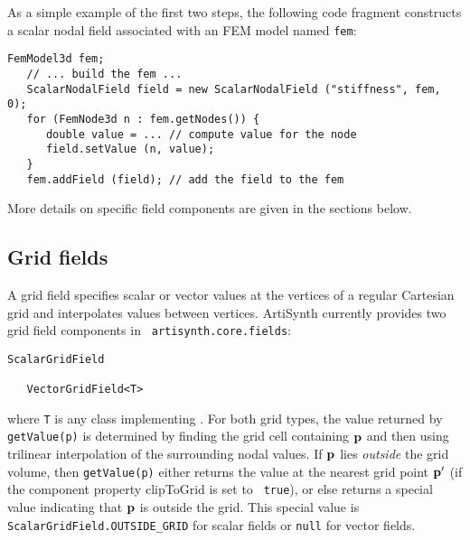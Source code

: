 As a simple example of the first two steps, the following code
fragment constructs a scalar nodal field associated with an FEM model
named {\tt fem}:
%
\begin{lstlisting}[]
   FemModel3d fem; 
   // ... build the fem ...
   ScalarNodalField field = new ScalarNodalField ("stiffness", fem, 0);
   for (FemNode3d n : fem.getNodes()) {
      double value = ... // compute value for the node
      field.setValue (n, value);
   }
   fem.addField (field); // add the field to the fem
\end{lstlisting}
%

More details on specific field components are given in the sections
below.

\subsection{Grid fields}
\label{sec:gridFields}

A grid field specifies scalar or vector values at the vertices of a
regular Cartesian grid and interpolates values between vertices.
ArtiSynth currently provides two grid field components in {\tt
artisynth.core.fields}:
%
\begin{lstlisting}[]
   ScalarGridField

   VectorGridField<T>
\end{lstlisting}
%
where {\tt T} is any class implementing
.  For both grid types, the
value returned by {\tt getValue(p)} is determined by finding the grid
cell containing ${\bf p}$ and then using trilinear interpolation of the
surrounding nodal values. If ${\bf p}$ lies {\it outside} the grid volume,
then {\tt getValue(p)} either returns the value at the nearest grid
point ${\bf p}'$ (if the component property {\sf clipToGrid} is set to {\tt
true}), or else returns a special value indicating that ${\bf p}$ is
outside the grid. This special value is {\tt
ScalarGridField.OUTSIDE\_GRID} for scalar fields or {\tt null} for
vector fields.

